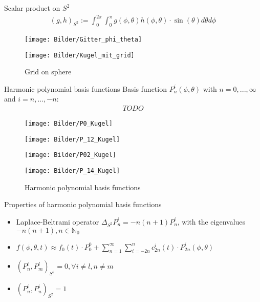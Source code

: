 \begin{frame}
	Scalar product on $S^2$
	\begin{align*}
		(g,h)_{S^2} := \int_{0}^{2\pi} \int_{0}^{\pi} g(\phi, \theta) h(\phi, \theta) \cdot \sin(\theta) d\theta d\phi
	\end{align*}

	\begin{figure}
		\small
		\begin{minipage}{0.46\textwidth}
			\texttt{[image: Bilder/Gitter\_phi\_theta]}
		\end{minipage}
		\hfill 
		\begin{minipage}{0.5\textwidth}
			\texttt{[image: Bilder/Kugel\_mit\_grid]}
		\end{minipage}
	\caption{Grid on sphere}
	\end{figure}
\end{frame}




\begin{frame}{Harmonic polynomial basis functions}
	Basis function ${P}^{i}_{n}(\phi, \theta)$ with $n = 0, ..., \infty$ and $i = n, ..., -n$:
	\begin{align*}
		TODO
	\end{align*}

	\begin{figure}
	\begin{minipage}{0.25\textwidth}
		\centering
		\texttt{[image: Bilder/P0\_Kugel]}
	\end{minipage}%
	\begin{minipage}{0.25\textwidth}
		\centering
		\texttt{[image: Bilder/P\_12\_Kugel]}
	\end{minipage}%
	\begin{minipage}{0.25\textwidth}
		\centering
		\texttt{[image: Bilder/P02\_Kugel]}
	\end{minipage}%
	\begin{minipage}{0.25\textwidth}
		\centering
		\texttt{[image: Bilder/P\_14\_Kugel]}
	\end{minipage}
	\caption{Harmonic polynomial basis functions}
	\end{figure}
\end{frame}

\begin{frame}{Properties of harmonic polynomial basis functions}
	\begin{itemize}
		\item Laplace-Beltrami operator $\Delta_{S^2}P^i_n = -n(n+1) P^i_n$, with the eigenvalues $-n(n +1),n \in \mathbb{N}_0$ 
		\item $	f(\phi, \theta, t) \approx f_0(t) \cdot P_0^0 + \sum_{n=1}^{\infty} \sum_{i=-2n}^{n} c^i_{2n}(t) \cdot P^i_{2n}(\phi, \theta)$
		\item $(P^i_n, P^l_m)_{S^2} = 0, \forall i \neq l, n \neq m$
		\item $	(P^i_n, P^i_n)_{S^2} = 1$
	\end{itemize}
\end{frame}

